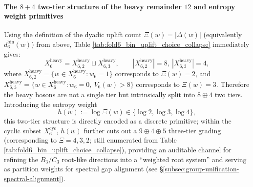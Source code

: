 \paragraph{The $8+4$ two-tier structure of the heavy remainder \(12\) and entropy weight primitives}
Using the definition of the dyadic uplift count \(\Xi(w)=|\Delta(w)|\) (equivalently \(d^{\mathrm{bin}}_6(w)\)) from above,
Table \ref{tab:fold6_bin_uplift_choice_collapse} immediately gives:
\[
X_6^{\mathrm{heavy}}=X_{6,2}^{\mathrm{heavy}}\sqcup X_{6,3}^{\mathrm{heavy}},
\qquad |X_{6,2}^{\mathrm{heavy}}|=8,\ |X_{6,3}^{\mathrm{heavy}}|=4,
\]
where
\(
X_{6,2}^{\mathrm{heavy}}=\{w\in X_6^{\mathrm{heavy}}:w_6=1\}
\)
corresponds to \(\Xi(w)=2\), and
\(
X_{6,3}^{\mathrm{heavy}}=\{w\in X_6^{\mathrm{heavy}}:w_6=0,\ V_6(w)>8\}
\)
corresponds to \(\Xi(w)=3\).
Therefore the heavy bosons are not a single tier but intrinsically split into \(8\oplus 4\) two tiers.
Introducing the entropy weight
\[
h(w):=\log \Xi(w)\in\{\log 2,\log 3,\log 4\},
\]
this two-tier structure is directly encoded as a discrete primitive; within the cyclic subset \(X_6^{\mathrm{cyc}}\),
\(h(w)\) further cuts out a \(9\oplus 4\oplus 5\) three-tier grading (corresponding to \(\Xi=4,3,2\); still enumerated from Table \ref{tab:fold6_bin_uplift_choice_collapse}),
providing an auditable channel for refining the \(B_3/C_3\) root-like directions into a ``weighted root system'' and serving as partition weights for spectral gap alignment (see \S\ref{subsec:group-unification-spectral-alignment}).

